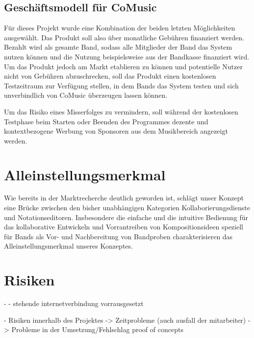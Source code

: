 \documentclass[12pt]{scrartcl}
\begin{document}
\subsection{Geschäftsmodell für CoMusic}

Für dieses Projekt wurde eine Kombination der beiden letzten Möglichkeiten ausgewählt. Das Produkt soll also über monatliche Gebühren finanziert werden. Bezahlt wird als gesamte Band, sodass alle Mitglieder der Band das System nutzen können und die Nutzung beispielsweise aus der Bandkasse finanziert wird. Um das Produkt jedoch am Markt etablieren zu können und potentielle Nutzer nicht von Gebühren abzuschrecken, soll das Produkt einen kostenlosen Testzeitraum zur Verfügung stellen, in dem Bands das System testen und sich unverbindlich von CoMusic überzeugen lassen können.

Um das Risiko eines Misserfolges zu vermindern, soll während der kostenlosen Testphase beim Starten oder Beenden des Programmes dezente und kontextbezogene Werbung von Sponsoren aus dem Musikbereich angezeigt werden.



\section{Alleinstellungsmerkmal}

Wie bereits in der Marktrecherche deutlich geworden ist, schlägt unser Konzept eine Brücke zwischen den bisher unabhängigen Kategorien Kollaborierungsdienste und Notationseditoren. Insbesondere die einfache und die intuitive Bedienung für das kollaborative Entwickeln und Vorrantreiben von Kompositionsideen speziell für Bands als Vor- und Nachbereitung von Bandproben charakterisieren das Alleinstellungsmerkmal unseres Konzeptes.


\section{Risiken}


- 
- stehende internetverbindung vorrausgesetzt

- Risiken innerhalb des Projektes
-> Zeitprobleme (auch ausfall der mitarbeiter)
-> Probleme in der Umsetzung/Fehlschlag proof of concepts
\end{document}
